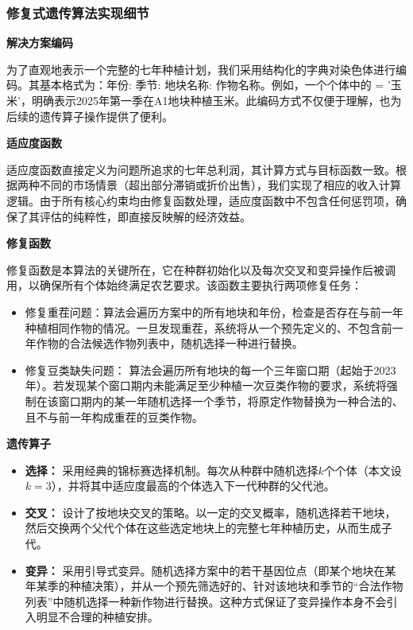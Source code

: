 \subsubsection{修复式遗传算法实现细节}

\textbf{解决方案编码}

为了直观地表示一个完整的七年种植计划，我们采用结构化的字典对染色体进行编码。其基本格式为：{年份: {季节: {地块名称: 作物名称}}}。例如，一个个体中的 = '玉米'，明确表示2025年第一季在A1地块种植玉米。此编码方式不仅便于理解，也为后续的遗传算子操作提供了便利。

\textbf{适应度函数}

适应度函数直接定义为问题所追求的七年总利润，其计算方式与目标函数一致。根据两种不同的市场情景（超出部分滞销或折价出售），我们实现了相应的收入计算逻辑。由于所有核心约束均由修复函数处理，适应度函数中不包含任何惩罚项，确保了其评估的纯粹性，即直接反映解的经济效益。

\textbf{修复函数}

修复函数是本算法的关键所在，它在种群初始化以及每次交叉和变异操作后被调用，以确保所有个体始终满足农艺要求。该函数主要执行两项修复任务：
\begin{itemize}
    \item 修复重茬问题：算法会遍历方案中的所有地块和年份，检查是否存在与前一年种植相同作物的情况。一旦发现重茬，系统将从一个预先定义的、不包含前一年作物的合法候选作物列表中，随机选择一种进行替换。
    \item 修复豆类缺失问题： 算法会遍历所有地块的每一个三年窗口期（起始于2023年）。若发现某个窗口期内未能满足至少种植一次豆类作物的要求，系统将强制在该窗口期内的某一年随机选择一个季节，将原定作物替换为一种合法的、且不与前一年构成重茬的豆类作物。
\end{itemize}

\textbf{遗传算子}

\begin{itemize}
    \item \textbf{选择：} 采用经典的锦标赛选择机制。每次从种群中随机选择$k$个个体（本文设$k=3$），并将其中适应度最高的个体选入下一代种群的父代池。
    \item \textbf{交叉：} 设计了按地块交叉的策略。以一定的交叉概率，随机选择若干地块，然后交换两个父代个体在这些选定地块上的完整七年种植历史，从而生成子代。
    \item \textbf{变异：} 采用引导式变异。随机选择方案中的若干基因位点（即某个地块在某年某季的种植决策），并从一个预先筛选好的、针对该地块和季节的“合法作物列表”中随机选择一种新作物进行替换。这种方式保证了变异操作本身不会引入明显不合理的种植安排。
\end{itemize}

